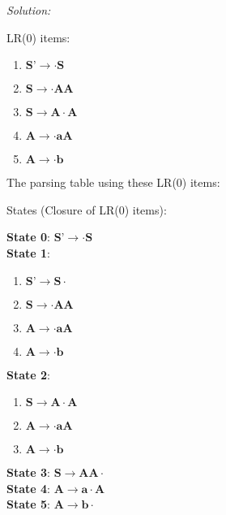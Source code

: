 \documentclass[a4paper, 11pt]{article}
\newenvironment{solution}
    {\textit{Solution:}}
    {}
\begin{document}
\begin{solution}

\noindent LR(0) items:

\begin{enumerate}
    \item  \(\textbf{S'} \longrightarrow \cdot \textbf{S}\)
    \item \(\textbf{S} \longrightarrow \cdot \textbf{AA}\)
    \item \(\textbf{S} \longrightarrow \textbf{A} \cdot \textbf{A}\)
    \item \(\textbf{A} \longrightarrow \cdot \textbf{aA}\)
    \item  \(\textbf{A} \longrightarrow \cdot \textbf{b}\)
\end{enumerate}

\noindent The parsing table using these LR(0) items:

\noindent States (Closure of LR(0) items):

\noindent \textbf{State 0}: \(\textbf{S'} \longrightarrow \cdot \textbf{S}\) \\

\noindent \textbf{State 1}:
\begin{enumerate}
\item 
\(\textbf{S'} \longrightarrow \textbf{S} \cdot\)
    \item 
\(\textbf{S} \longrightarrow \cdot \textbf{AA}\)
    \item 
\(\textbf{A} \longrightarrow \cdot \textbf{aA}\)
    \item 
\(\textbf{A} \longrightarrow \cdot \textbf{b}\)
    
\end{enumerate} 
\noindent \textbf{State 2}:
\begin{enumerate}
    \item 
\(\textbf{S} \longrightarrow \textbf{A} \cdot \textbf{A}\)
    \item 
\(\textbf{A} \longrightarrow \cdot \textbf{aA}\)
    \item 
\(\textbf{A} \longrightarrow \cdot \textbf{b}\)
    
\end{enumerate}
\noindent \textbf{State 3}:  \(\textbf{S} \longrightarrow \textbf{AA} \cdot\) \\
\noindent  \textbf{State 4}: \(\textbf{A} \longrightarrow \textbf{a} \cdot \textbf{A}\) \\
\noindent  \textbf{State 5}: \(\textbf{A} \longrightarrow \textbf{b} \cdot\)



\end{solution}
\end{document}
